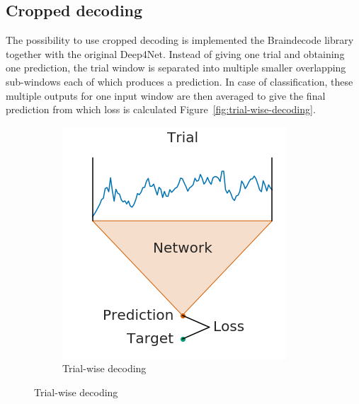 \subsection{Cropped decoding}\label{subsec:cropped-decoding}
The possibility to use cropped decoding is implemented the Braindecode library together with the original Deep4Net.
Instead of giving one trial and obtaining one prediction, the trial window is separated into multiple smaller overlapping sub-windows each of which produces a prediction.
In case of classification, these multiple outputs for one input window are then averaged to give the final prediction from which loss is calculated Figure~\ref{fig:trial-wise-decoding}.


\begin{figure}[!htpb]
\centering
\begin{subfigure}[b]{0.4\textwidth}
   \includegraphics[width=0.9\linewidth]{img/ch3/trialwise-explanation.png}
   \caption{Trial-wise decoding}
\end{subfigure}\label{fig:trial-wise-decoding-trial-wise}


\end{figure}
